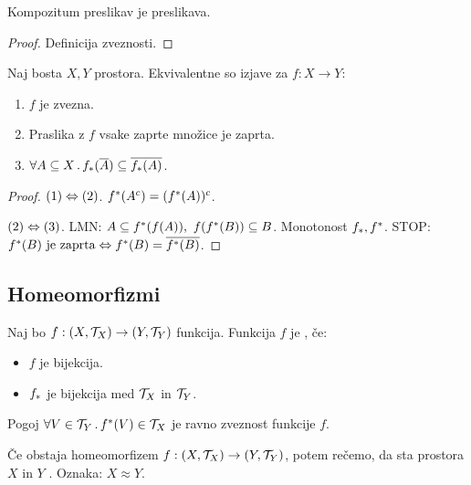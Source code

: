 \begin{trditev}
    Kompozitum preslikav je preslikava.
\end{trditev}

\begin{proof}
    Definicija zveznosti.
\end{proof}

\begin{trditev}
    Naj bosta $X, Y$ prostora. Ekvivalentne so izjave za $f: X \to Y$:
    \begin{enumerate}
        \item $f$ je zvezna.
        \item Praslika z $f$ vsake zaprte množice je zaprta.
        \item $\forall A \subseteq X \,.\, f_{*}(\overline{A}) \subseteq \overline{f_{*}(A)}$.
    \end{enumerate}
\end{trditev}

\begin{proof}
    $(1) \Leftrightarrow (2)$. $f^{*}(A^c) = (f^{*}(A))^c$.

    $(2) \Leftrightarrow (3)$. LMN: $A \subseteq f^{*}(f(A)), \ f(f^{*}(B)) \subseteq B$. Monotonost $f_{*}, f^{*}$. STOP:
    $f^{*}(B) \text{ je zaprta} \Leftrightarrow f^{*}(B) = \overline{f^{*}(B)}$.
\end{proof}

\newpage
\subsection{Homeomorfizmi}
\begin{definicija}
    Naj bo $f: (X, \mathcal{T}_X) \to (Y, \mathcal{T}_Y)$ funkcija. Funkcija $f$ je , če:
    \begin{itemize}
        \item $f$ je bijekcija.
        \item $f_{*}$ je bijekcija med $\mathcal{T}_X$ in $\mathcal{T}_Y$.
    \end{itemize}
\end{definicija}

\begin{opomba}
    Pogoj $\forall V \in \mathcal{T}_Y \,.\, f^{*}(V) \in \mathcal{T}_X$ je ravno zveznost funkcije $f$.
\end{opomba}

\begin{definicija}
    Če obstaja homeomorfizem $f: (X, \mathcal{T}_X) \to (Y, \mathcal{T}_Y)$, potem rečemo, da sta prostora $X$ in $Y$ . Oznaka: $X \approx  Y$.
\end{definicija}


